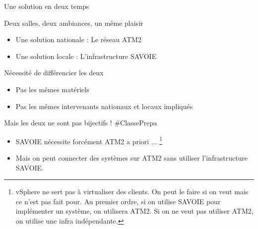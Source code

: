 \begin{frame}{Une solution en deux temps}
\begin{block}{Deux salles, deux ambiances, un même plaisir}
\begin{itemize}
    \item Une solution nationale : Le réseau ATM2 
    \item Une solution locale : L'infrastructure SAVOIE
\end{itemize}
\end{block} 

\begin{alertblock}{Nécessité de différencier les deux}
\begin{itemize}
    \item Pas les mêmes matériels
    \item Pas les mêmes intervenants nationaux et locaux impliqués
\end{itemize}
\end{alertblock} 

\begin{alertblock}{Mais les deux ne sont pas bijectifs ! \#ClassePrepa}
\begin{itemize}
    \item SAVOIE nécessite forcément ATM2 a priori ... \footnote{vSphere ne sert pas à virtualiser des clients. On peut le faire si on veut mais ce n'est pas fait pour. Au premier ordre, si on utilise SAVOIE pour implémenter un système, on utilisera ATM2. Si on ne veut pas utiliser ATM2, on utilise une infra indépendante.}
    \item Mais on peut connecter des systèmes sur ATM2 sans utiliser l'infrastructure SAVOIE. 
\end{itemize}
\end{alertblock} 
\end{frame}